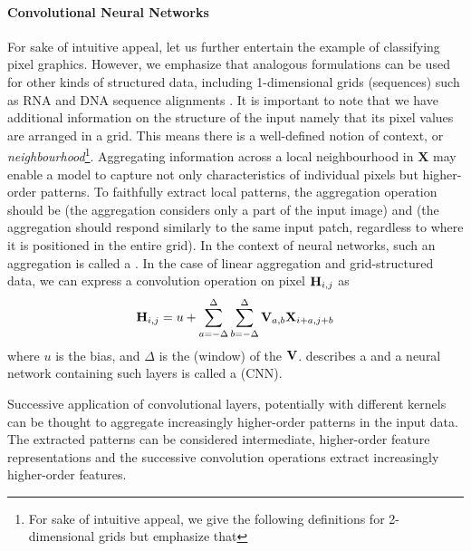 \documentclass[
	fontsize=10pt, %
	twoside=false, %
	secnumdepth=1, %
]{kaobook}
\begin{document}
\paragraph{Convolutional Neural Networks}
For sake of intuitive appeal, let us further entertain the example of
classifying pixel graphics. However, we emphasize that 
analogous formulations can be used for other kinds of structured data,
including 1-dimensional grids (sequences) such as RNA and DNA sequence alignments
\cite{flagel_UnreasonableEffectivenessConvolutional_2019}\cite{aoki_ConvolutionalNeuralNetworks_2018}.
It is important to note that we have additional
information on the structure of the input
namely that its pixel values are arranged in a grid. This means there is a
well-defined notion of context, or \textit{neighbourhood}\footnote{ For sake of
  intuitive appeal, we give the following definitions for 2-dimensional grids
  but emphasize that 
}.
%
Aggregating information across a local neighbourhood in $\mathbf{X}$ may enable
a model to capture not only characteristics of individual pixels but
higher-order patterns. To faithfully extract local patterns, the aggregation
operation should be  (the aggregation considers only a part of the
input image) and  (the aggregation should respond
similarly to the same input patch, regardless to where it is positioned in the
entire grid). In the context of neural networks, such an aggregation is called a
 \cite{zhang_dive_nodate}. In the case of linear aggregation
and grid-structured data, we can express a convolution operation on pixel $\mathbf{H}_{i,j}$ as
\begin{align}
  \mathbf{H}_{i,j} = u + \sum_{a= -\Delta}^\Delta \sum_{b = -\Delta}^\Delta \mathbf{V}_{a,b} \mathbf{X}_{i+a,j+b}
  \label{eq:convolution}
\end{align}
where $u$ is the bias, and $\Delta$ is the (window)  of the
 $\mathbf{V}$.  describes a
 and a neural network containing such layers is called
a  (CNN).

Successive application of convolutional layers,
potentially with different kernels can be thought to aggregate increasingly
higher-order patterns in the input data. The extracted patterns can be
considered intermediate, higher-order feature representations and the successive
convolution operations extract increasingly higher-order features.
\end{document}
